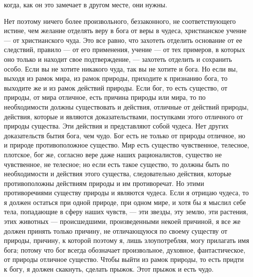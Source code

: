 \documentclass[12pt]{article}
\begin{document}
когда, как он это замечает в другом месте, они нужны. 

Нет поэтому ничего более произвольного, беззаконного, не соответствующего истине, чем желание отделять веру в бога от веры в чудеса, христианское учение --- от христианского чуда. Это все равно, что захотеть отделить основание от ее следствий, правило --- от его применения, учение --- от тех примеров, в которых оно только и находит свое подтверждение, --- захотеть отделить и сохранить особо. Если вы не хотите никакого чуда, так вы не хотите и бога. Но если вы, выходя из рамок мира, из рамок природы, приходите к признанию бога, то выходите же и из рамок действий природы. Если бог, то есть существо, от природы, от мира отличное, есть причина природы или мира, то по необходимости должны существовать и действия, отличные от действий природы, действия, которые и являются доказательствами, поступками этого отличного от природы существа. Эти действия и представляют собой чудеса. Нет других доказательств бытия бога, чем чудо. Бог есть не только от природы отличное, но и природе противоположное существо. Мир есть существо чувственное, телесное, плотское, бог же, согласно вере даже наших рационалистов, существо не чувственное, не телесное; но если есть такое существо, то должны быть по необходимости и действия этого существа, следовательно действия, которые противоположны действиям природы и им противоречат. Но этими противоречиями существу природы и являются чудеса. Если я отрицаю чудеса, то я должен остаться при одной природе, при одном мире, и хотя бы я мыслил себе тела, попадающие в сферу наших чувств, --- эти звезды, эту землю, эти растения, этих животных --- происшедшими, произведенными некоей причиной, я все же должен принять только причину, не отличающуюся по своему существу от природы, причину, к которой поэтому я, лишь злоупотребляя, могу прилагать имя бога; потому что бог всегда обозначает произвольное, духовное, фантастическое, от природы отличное существо. Чтобы выйти из рамок природы, то есть придти к богу, я должен скакнуть, сделать прыжок. Этот прыжок и есть чудо. 
\end{document}
